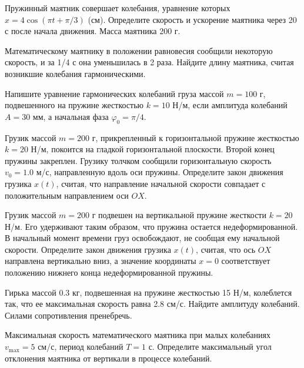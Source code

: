 \begin{ex}
Пружинный маятник совершает колебания, уравнение которых $x = 4\cos(\pi t + \pi/3)$ (см). Определите скорость и ускорение маятника через 20 с после начала движения. Масса маятника 200 г.
\end{ex}	

\begin{ex}
Математическому маятнику в положении равновесия сообщили некоторую скорость, и за 1/4 с она уменьшилась в 2 раза. Найдите длину маятника, считая возникшие колебания гармоническими.
\end{ex}	

\begin{ex}
Напишите уравнение гармонических колебаний груза массой $m = 100$ г, подвешенного на пружине жесткостью $k = 10$ Н/м, если амплитуда колебаний $A = 30 $ мм, а начальная фаза $\varphi_0 = \pi/4$.
\end{ex}	

\begin{ex}
Грузик массой $m = 200$ г, прикрепленный к горизонтальной пружине жесткостью $k = 20 $ Н/м, покоится на гладкой горизонтальной плоскости. Второй конец пружины закреплен. Грузику толчком сообщили горизонтальную скорость $v_0 = 1.0$ м/с, направленную вдоль оси пружины. Определите закон движения грузика $x(t)$, считая, что направление начальной скорости совпадает с положительным направлением оси $OX$.
\end{ex}	

\begin{ex}
Грузик массой $m = 200$ г подвешен на вертикальной пружине жесткости $k = 20$ Н/м. Его удерживают таким образом, что пружина остается недеформированной. В начальный момент времени груз освобождают, не сообщая ему начальной скорости. Определите закон движения грузика $x(t)$, считая, что ось $OX$ направлена вертикально вниз, а значение координаты $x = 0$ соответствует положению нижнего конца недеформированной пружины.
\end{ex}	

\begin{ex}
Гирька массой 0.3 кг, подвешенная на пружине жесткостью 15 Н/м, колеблется так, что ее максимальная скорость равна 2.8 см/с. Найдите амплитуду колебаний. Силами сопротивления пренебречь.
\end{ex}	

\begin{ex}
Максимальная скорость математического маятника при малых колебаниях $v_{\max} = 5 $ см/с, период колебаний $T = 1$ с. Определите максимальный угол отклонения маятника от вертикали в процессе колебаний.
\end{ex}	

